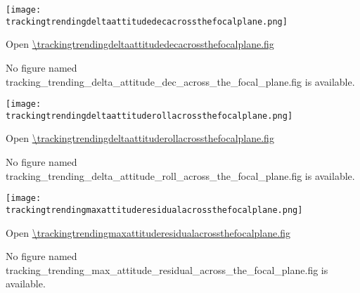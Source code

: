\ifdefined \trackingtrendingdeltaattitudedecacrossthefocalplane

\begin{center}
  \texttt{[image: \\trackingtrendingdeltaattitudedecacrossthefocalplane.png]}
\end{center}

Open \url{\trackingtrendingdeltaattitudedecacrossthefocalplane.fig}

\else
No figure named
tracking\_trending\_delta\_attitude\_dec\_across\_the\_focal\_plane.fig
is available.
\fi

\ifdefined \trackingtrendingdeltaattituderollacrossthefocalplane

\begin{center}
  \texttt{[image: \\trackingtrendingdeltaattituderollacrossthefocalplane.png]}
\end{center}

Open \url{\trackingtrendingdeltaattituderollacrossthefocalplane.fig}

\else
No figure named
tracking\_trending\_delta\_attitude\_roll\_across\_the\_focal\_plane.fig
is available.
\fi

\ifdefined \trackingtrendingmaxattituderesidualacrossthefocalplane

\begin{center}
  \texttt{[image: \\trackingtrendingmaxattituderesidualacrossthefocalplane.png]}
\end{center}

Open \url{\trackingtrendingmaxattituderesidualacrossthefocalplane.fig}

\else
No figure named
tracking\_trending\_max\_attitude\_residual\_across\_the\_focal\_plane.fig
is available.
\fi

\clearpage
